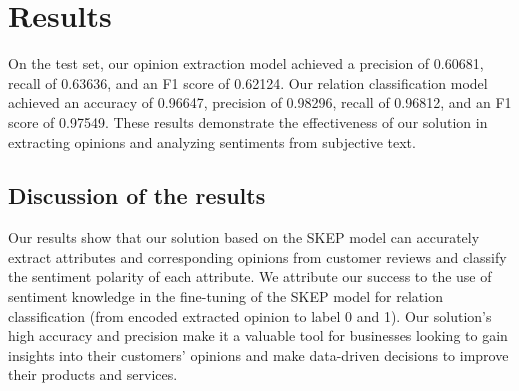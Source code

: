 \section{Results}

On the test set, our opinion extraction model achieved a precision of 0.60681, recall of 0.63636, and an F1 score of 0.62124. Our relation classification model achieved an accuracy of 0.96647, precision of 0.98296, recall of 0.96812, and an F1 score of 0.97549. These results demonstrate the effectiveness of our solution in extracting opinions and analyzing sentiments from subjective text.

\subsection{Discussion of the results}

Our results show that our solution based on the SKEP model can accurately extract attributes and corresponding opinions from customer reviews and classify the sentiment polarity of each attribute. We attribute our success to the use of sentiment knowledge in the fine-tuning of the SKEP model for relation classification (from encoded extracted opinion to label 0 and 1). Our solution's high accuracy and precision make it a valuable tool for businesses looking to gain insights into their customers' opinions and make data-driven decisions to improve their products and services.

